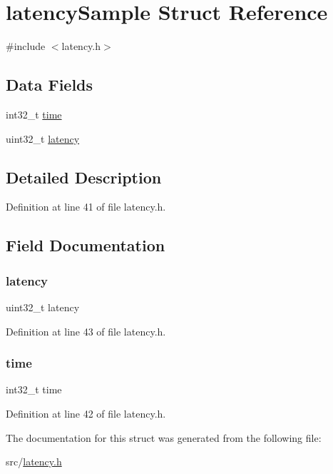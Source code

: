 \hypertarget{structlatency_sample}{}\section{latency\+Sample Struct Reference}
\label{structlatency_sample}


{\ttfamily \#include $<$latency.\+h$>$}

\subsection*{Data Fields}
\begin{DoxyCompactItemize}
\item 
int32\+\_\+t \hyperlink{structlatency_sample_abff537f25bc8d06192bd18aff2597aa0}{time}
\item 
uint32\+\_\+t \hyperlink{structlatency_sample_acd3d24a29a6e07be2bd52fcaffecc872}{latency}
\end{DoxyCompactItemize}


\subsection{Detailed Description}


Definition at line 41 of file latency.\+h.



\subsection{Field Documentation}
\mbox{\label{structlatency_sample_acd3d24a29a6e07be2bd52fcaffecc872}} 
\subsubsection{\texorpdfstring{latency}{latency}}
{\footnotesize\ttfamily uint32\+\_\+t latency}



Definition at line 43 of file latency.\+h.

\mbox{\label{structlatency_sample_abff537f25bc8d06192bd18aff2597aa0}} 
\subsubsection{\texorpdfstring{time}{time}}
{\footnotesize\ttfamily int32\+\_\+t time}



Definition at line 42 of file latency.\+h.



The documentation for this struct was generated from the following file\+:\begin{DoxyCompactItemize}
\item 
src/\hyperlink{latency_8h}{latency.\+h}\end{DoxyCompactItemize}
